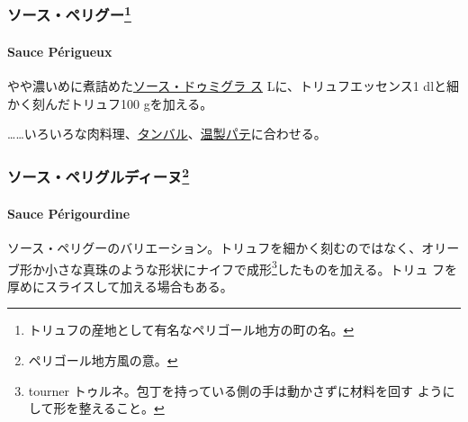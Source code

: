 \begin{recette}
\maeaki

\hypertarget{ux30bdux30fcux30b9ux30daux30eaux30b0ux30fc59}{%
\subsubsection[ソース・ペリグー]{\texorpdfstring{ソース・ペリグー\footnote{トリュフの産地として有名なペリゴール地方の町の名。}}{ソース・ペリグー}}\label{ux30bdux30fcux30b9ux30daux30eaux30b0ux30fc59}}

\hypertarget{sauce-perigueux}{%
\paragraph{Sauce Périgueux}\label{sauce-perigueux}}

  

やや濃いめに煮詰めた\protect\hyperlink{sauce-demi-glace}{ソース・ドゥミグラ
ス}\troisquarts{} Lに、トリュフエッセンス1 \undemi{}
dlと細かく刻んだトリュフ100 gを加える。

\ldots{}\ldots{}いろいろな肉料理、\protect\hyperlink{}{タンバル}、\protect\hyperlink{}{温製パテ}に合わせる。

\maeaki

\hypertarget{ux30bdux30fcux30b9ux30daux30eaux30b0ux30ebux30c7ux30a3ux30fcux30cc60}{%
\subsubsection[ソース・ペリグルディーヌ]{\texorpdfstring{ソース・ペリグルディーヌ\footnote{ペリゴール地方風の意。}}{ソース・ペリグルディーヌ}}\label{ux30bdux30fcux30b9ux30daux30eaux30b0ux30ebux30c7ux30a3ux30fcux30cc60}}

\hypertarget{sauce-puxe9rigourdine}{%
\paragraph{Sauce Périgourdine}\label{sauce-puxe9rigourdine}}


ソース・ペリグーのバリエーション。トリュフを細かく刻むのではなく、オリー
ブ形か小さな真珠のような形状にナイフで成形\footnote{tourner
  トゥルネ。包丁を持っている側の手は動かさずに材料を回す
  ようにして形を整えること。}したものを加える。トリュ
フを厚めにスライスして加える場合もある。


\end{recette}
